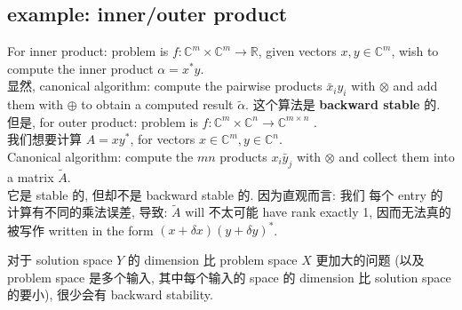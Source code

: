 \subsection{example: inner/outer product }
For inner product: problem is $f: \mathbb{C}^m\times \mathbb{C}^m \to \mathbb{R}$,  given vectors $x, y \in \mathbb{C}^m$, wish to compute the inner product $\alpha=x^* y$.\\
显然, canonical algorithm: compute the pairwise products $\bar{x}_i y_i$ with $\otimes$ and add them with $\oplus$ to obtain a computed result $\tilde{\alpha}$. 
这个算法是 \textbf{backward stable} 的.\\
但是, for outer product: problem is $f:  \mathbb{C}^m \times  \mathbb{C}^n \to  \mathbb{C}^{m\times n}$ .\\
我们想要计算 $A=x y^*$, for vectors $x \in \mathbb{C}^m, y \in \mathbb{C}^n$. \\
Canonical algorithm: compute the $m n$ products $x_i \bar{y}_j$ with $\otimes$ and collect them into a matrix $\tilde{A}$. \\
它是 stable 的, 但却不是 backward stable 的. 因为直观而言: 我们 每个 entry 的计算有不同的乘法误差, 导致:  $\tilde{A}$ will 不太可能 have rank exactly 1, 因而无法真的被写作 written in the form $(x+\delta x)(y+\delta y)^*$. \\
\begin{remark}
对于 solution space $Y$ 的 dimension 比 problem space $X$ 更加大的问题 (以及 problem space 是多个输入, 其中每个输入的 space 的 dimension 比 solution space 的要小), 很少会有 backward stability.
\end{remark}


